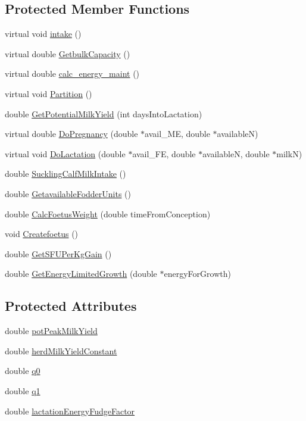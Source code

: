 \subsection*{Protected Member Functions}
\begin{DoxyCompactItemize}
\item 
virtual void \hyperlink{classdk__cattle_ac26882672df3b641aa96104dcb4eccef}{intake} ()
\item 
virtual double \hyperlink{classdk__cattle_a706687977fea1dc291900edcb681917d}{GetbulkCapacity} ()
\item 
virtual double \hyperlink{classdk__cattle_aecbc80f8b09fd9b7e31b3cba2c6fe7b5}{calc\_\-energy\_\-maint} ()
\item 
virtual void \hyperlink{classdk__cattle_a2d6a1d109141cc874f41d4e462eaa728}{Partition} ()
\item 
double \hyperlink{classdk__cattle_a33782ebe3783a6ef6ff393b0803c53b4}{GetPotentialMilkYield} (int daysIntoLactation)
\item 
virtual double \hyperlink{classdk__cattle_af9b81a29747448215d0dccfae641ee3a}{DoPregnancy} (double $\ast$avail\_\-ME, double $\ast$availableN)
\item 
virtual void \hyperlink{classdk__cattle_a809188c9cd87733a145f334208cc6e85}{DoLactation} (double $\ast$avail\_\-FE, double $\ast$availableN, double $\ast$milkN)
\item 
double \hyperlink{classdk__cattle_a448e3a99c61a223770c53dd023e1a9da}{SucklingCalfMilkIntake} ()
\item 
double \hyperlink{classdk__cattle_a01c48455806f5540445eb6f0cba46955}{GetavailableFodderUnits} ()
\item 
double \hyperlink{classdk__cattle_ae2808ab57881060f11d0109a9a489798}{CalcFoetusWeight} (double timeFromConception)
\item 
void \hyperlink{classdk__cattle_ab5538cedcf88ec9337c48fe35eaf75aa}{Createfoetus} ()
\item 
double \hyperlink{classdk__cattle_ac50410fe44f32c4912f72941c8573fc0}{GetSFUPerKgGain} ()
\item 
double \hyperlink{classdk__cattle_a687c519c4525449e126072abf555358c}{GetEnergyLimitedGrowth} (double $\ast$energyForGrowth)
\end{DoxyCompactItemize}
\subsection*{Protected Attributes}
\begin{DoxyCompactItemize}
\item 
double \hyperlink{classdk__cattle_ace4c1d37bba3bfc12ced3fb03c0d1308}{potPeakMilkYield}
\item 
double \hyperlink{classdk__cattle_ae6e782886cf7ce9d85442ee0f531e665}{herdMilkYieldConstant}
\item 
double \hyperlink{classdk__cattle_ae3e29008dabce4e25f23783c7152e3c2}{q0}
\item 
double \hyperlink{classdk__cattle_a4ef5cf4c301adad64cc28f234fdc4419}{q1}
\item 
double \hyperlink{classdk__cattle_af0fd0845b1b42563e7a5395c7131cf7a}{lactationEnergyFudgeFactor}
\end{DoxyCompactItemize}


